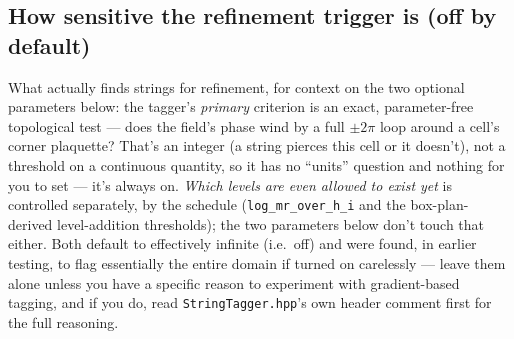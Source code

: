 \documentclass[11pt]{article}
\begin{document}
\subsection{How sensitive the refinement trigger is (off by default)}

What actually finds strings for refinement, for context on the two optional parameters below: the tagger's
\emph{primary} criterion is an exact, parameter-free topological test --- does the field's phase wind by a
full $\pm 2\pi$ loop around a cell's corner plaquette? That's an integer (a string pierces this cell or it
doesn't), not a threshold on a continuous quantity, so it has no ``units'' question and nothing for you to
set --- it's always on. \emph{Which levels are even allowed to exist yet} is controlled separately, by the
schedule (\texttt{log\_mr\_over\_h\_i} and the box-plan-derived level-addition thresholds); the two
parameters below don't touch that either. Both default to effectively infinite (i.e.\ off) and were found,
in earlier testing, to flag essentially the entire domain if turned on carelessly --- leave them alone
unless you have a specific reason to experiment with gradient-based tagging, and if you do, read
\texttt{StringTagger.hpp}'s own header comment first for the full reasoning.
\end{document}
